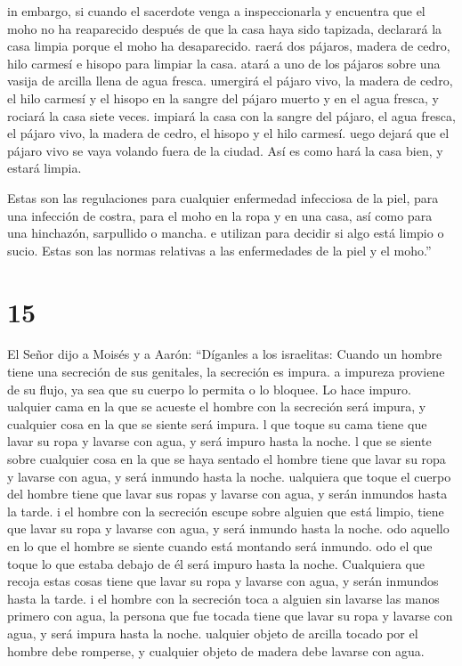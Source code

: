  in embargo, si cuando el sacerdote venga a inspeccionarla
y encuentra que el moho no ha reaparecido después de que la casa haya
sido tapizada, declarará la casa limpia porque el moho ha desaparecido.
 raerá dos pájaros, madera de cedro, hilo carmesí e hisopo
para limpiar la casa.  atará a uno de los pájaros sobre una
vasija de arcilla llena de agua fresca.  umergirá el pájaro
vivo, la madera de cedro, el hilo carmesí y el hisopo en la sangre del
pájaro muerto y en el agua fresca, y rociará la casa siete veces.
 impiará la casa con la sangre del pájaro, el agua fresca,
el pájaro vivo, la madera de cedro, el hisopo y el hilo carmesí.
 uego dejará que el pájaro vivo se vaya volando fuera de la
ciudad. Así es como hará la casa bien, y estará limpia.

 Estas son las regulaciones para cualquier enfermedad
infecciosa de la piel, para una infección de costra,  para
el moho en la ropa y en una casa,  así como para una
hinchazón, sarpullido o mancha.  e utilizan para decidir si
algo está limpio o sucio. Estas son las normas relativas a las
enfermedades de la piel y el moho.''

\hypertarget{section-14}{%
\section{15}\label{section-14}}

 El Señor dijo a Moisés y a Aarón:  ``Díganles a
los israelitas: Cuando un hombre tiene una secreción de sus genitales,
la secreción es impura.  a impureza proviene de su flujo, ya
sea que su cuerpo lo permita o lo bloquee. Lo hace impuro. 
ualquier cama en la que se acueste el hombre con la secreción será
impura, y cualquier cosa en la que se siente será impura.  l
que toque su cama tiene que lavar su ropa y lavarse con agua, y será
impuro hasta la noche.  l que se siente sobre cualquier cosa
en la que se haya sentado el hombre tiene que lavar su ropa y lavarse
con agua, y será inmundo hasta la noche.  ualquiera que
toque el cuerpo del hombre tiene que lavar sus ropas y lavarse con agua,
y serán inmundos hasta la tarde.  i el hombre con la
secreción escupe sobre alguien que está limpio, tiene que lavar su ropa
y lavarse con agua, y será inmundo hasta la noche.  odo
aquello en lo que el hombre se siente cuando está montando será inmundo.
 odo el que toque lo que estaba debajo de él será impuro
hasta la noche. Cualquiera que recoja estas cosas tiene que lavar su
ropa y lavarse con agua, y serán inmundos hasta la tarde. 
i el hombre con la secreción toca a alguien sin lavarse las manos
primero con agua, la persona que fue tocada tiene que lavar su ropa y
lavarse con agua, y será impura hasta la noche.  ualquier
objeto de arcilla tocado por el hombre debe romperse, y cualquier objeto
de madera debe lavarse con agua.

